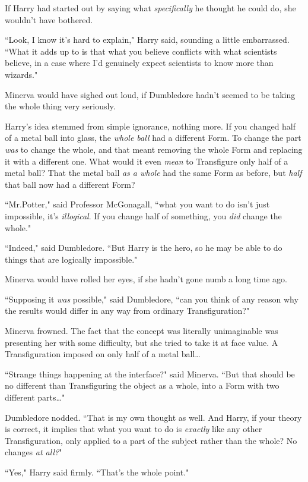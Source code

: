 If Harry had started out by saying what \emph{specifically} he thought he could do, she wouldn't have bothered.

``Look, I know it's hard to explain," Harry said, sounding a little embarrassed. ``What it adds up to is that what you believe conflicts with what scientists believe, in a case where I'd genuinely expect scientists to know more than wizards."

Minerva would have sighed out loud, if Dumbledore hadn't seemed to be taking the whole thing very seriously.

Harry's idea stemmed from simple ignorance, nothing more. If you changed half of a metal ball into glass, the \emph{whole ball} had a different Form. To change the part \emph{was} to change the whole, and that meant removing the whole Form and replacing it with a different one. What would it even \emph{mean} to Transfigure only half of a metal ball? That the metal ball \emph{as a whole} had the same Form as before, but \emph{half} that ball now had a different Form?

``Mr.\?Potter," said Professor McGonagall, ``what you want to do isn't just impossible, it's \emph{illogical}. If you change half of something, you \emph{did} change the whole."

``Indeed," said Dumbledore. ``But Harry is the hero, so he may be able to do things that are logically impossible."

Minerva would have rolled her eyes, if she hadn't gone numb a long time ago.

``Supposing it \emph{was} possible," said Dumbledore, ``can you think of any reason why the results would differ in any way from ordinary Transfiguration?"

Minerva frowned. The fact that the concept was literally unimaginable was presenting her with some difficulty, but she tried to take it at face value. A Transfiguration imposed on only half of a metal ball{\ldots}

``Strange things happening at the interface?" said Minerva. ``But that should be no different than Transfiguring the object as a whole, into a Form with two different parts{\ldots}"

Dumbledore nodded. ``That is my own thought as well. And Harry, if your theory is correct, it implies that what you want to do is \emph{exactly} like any other Transfiguration, only applied to a part of the subject rather than the whole? No changes \emph{at all?}"

``Yes," Harry said firmly. ``That's the whole point."

